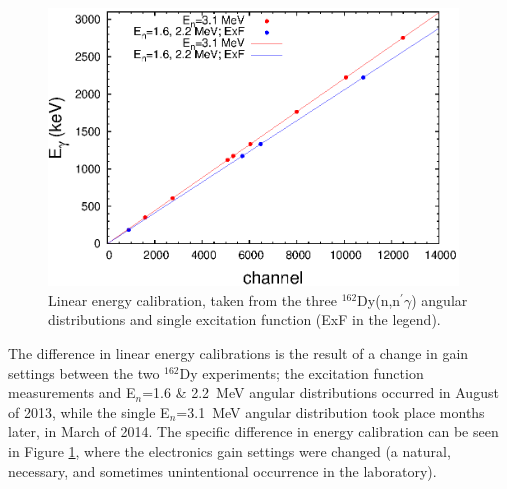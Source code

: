 \begin{figure}[ht]
\begin{center}
\includegraphics[width=0.97\textwidth]{310_energy_calib.eps}
\caption{Linear energy calibration, taken from the three $^{162}$Dy(n,n$^{\prime}\gamma$) angular distributions and single excitation function (ExF in the legend).}
\label{fig:energy_calib}
\end{center}
\end{figure}

The difference in linear energy calibrations is the result of a change in gain settings between the two $^{162}$Dy experiments; the excitation function measurements and E$_n$=1.6 \& 2.2~MeV angular distributions occurred in August of 2013, while the single E$_n$=3.1~MeV angular distribution took place months later, in March of 2014. The specific difference in energy calibration can be seen in Figure \ref{fig:energy_calib}, where the electronics gain settings were changed (a natural, necessary, and sometimes unintentional occurrence in the laboratory). %

